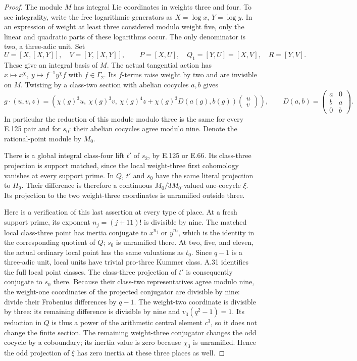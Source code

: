 \begin{proof}
The module \(M\) has integral Lie coordinates in weights
three and four. To see integrality, write the free
logarithmic generators as
\(X=\log x\), \(Y=\log y\). In an expression of weight
at least three considered modulo weight five, only the
linear and quadratic parts of these logarithms occur.
The only denominator is two, a three-adic unit.
Set
\[
 U=[X,[X,Y]],\quad V=[Y,[X,Y]],\qquad
 P=[X,U],\quad Q_1=[Y,U]=[X,V],\quad R=[Y,V].
\]
These give an integral basis of \(M\). The actual
tangential action has
\(x\mapsto x^\chi,\ y\mapsto f^{-1}y^\chi f\) with
\(f\in\Gamma_2\). Its \(f\)-terms raise weight by two
and are invisible on \(M\). Twisting by a class-two
section with abelian cocycles \(a,b\) gives
\[
 g\cdot(u,v,z)=
 \left(\chi(g)^3u,\ \chi(g)^3v,\
 \chi(g)^4z+
 \chi(g)^3D(a(g),b(g))
                  \begin{pmatrix}u\\v\end{pmatrix}\right),
 \qquad
 D(a,b)=
 \begin{pmatrix}a&0\\ b&a\\0&b\end{pmatrix}.
 \tag{E.130.2}
\]
In particular the reduction of this module modulo three
is the same for every E.125 pair and for \(s_0\):
their abelian cocycles agree modulo nine.
Denote the rational-point module by \(M_0\).

There is a global integral class-four lift \(t'\) of
\(s_2\), by E.125 or E.66. Its class-three projection
is support matched, since the local weight-three first
cohomology vanishes at every support prime.
In \(Q\), \(t'\) and \(s_0\) have the same literal
projection to \(H_9\). Their difference is therefore
a continuous \(M_0/3M_0\)-valued one-cocycle \(\xi\).
Its projection to the two weight-three coordinates
is unramified outside three.

Here is a verification of this last assertion at every
type of place. At a fresh support prime, its exponent
\(n_j=(j+11)!\) is divisible by nine. The matched local
class-three point has inertia conjugate to \(x^{n_j}\)
or \(y^{n_j}\), which is the identity in the corresponding
quotient of \(Q\); \(s_0\) is unramified there.
At two, five, and eleven, the actual ordinary local
point has the same valuations as \(t_0\).
Since \(q-1\) is a three-adic unit, local units have
trivial pro-three Kummer class. A.31 identifies the full
local point classes. The class-three projection of
\(t'\) is consequently conjugate to \(s_0\) there.
Because their class-two representatives agree modulo
nine, the weight-one coordinates of the projected
conjugator are divisible by nine: divide their
Frobenius differences by \(q-1\).
The weight-two coordinate is divisible by three:
its remaining difference is divisible by nine and
\(v_3(q^2-1)=1\).
Its reduction in \(Q\) is thus a power of the arithmetic
central element \(c^3\), so it does not change the
finite section. The remaining weight-three
conjugator changes the odd cocycle by a coboundary;
its inertia value is zero because \(\chi_3\) is
unramified. Hence the odd projection of \(\xi\) has
zero inertia at these three places as well.


\end{proof}
